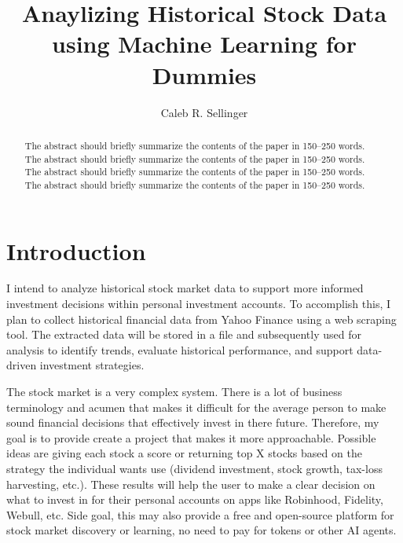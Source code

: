 \documentclass[runningheads]{llncs}
\begin{document}
%
\title{Anaylizing Historical Stock Data using Machine Learning for Dummies}
%
%
\author{Caleb R. Sellinger}
%
%
%
\maketitle              %
%
\begin{abstract}
The abstract should briefly summarize the contents of the paper in
150--250 words. The abstract should briefly summarize the contents of the paper in
150--250 words. The abstract should briefly summarize the contents of the paper in
150--250 words. The abstract should briefly summarize the contents of the paper in
150--250 words.

\end{abstract}
%
%
%
\section{Introduction}

I intend to analyze historical stock market data to support more informed investment decisions within personal investment accounts. To accomplish this, I plan to collect historical financial data from Yahoo Finance using a web scraping tool. The extracted data will be stored in a file and subsequently used for analysis to identify trends, evaluate historical performance, and support data-driven investment strategies.\cite{YahooFinance}

The stock market is a very complex system. There is a lot of business terminology and acumen that makes it difficult for the average person to make sound financial decisions that effectively invest in there future. Therefore, my goal is to provide create a project that makes it more approachable. Possible ideas are giving each stock a score or returning top X stocks based on the strategy the individual wants use (dividend investment, stock growth, tax-loss harvesting, etc.). These results will help the user to make a clear decision on what to invest in for their personal accounts on apps like Robinhood, Fidelity, Webull, etc. Side goal, this may also provide a free and open-source platform for stock market discovery or learning, no need to pay for tokens or
other AI agents.
\end{document}
